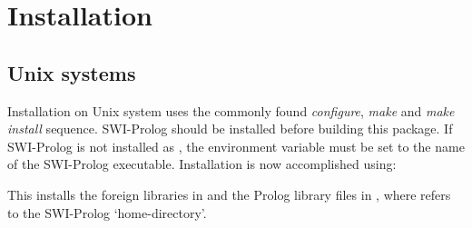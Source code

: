\documentclass[11pt]{article}
\begin{document}
\section{Installation}

\subsection{Unix systems}

Installation on Unix system uses the commonly found {\em configure},
{\em make} and {\em make install} sequence. SWI-Prolog should be
installed before building this package. If SWI-Prolog is not installed
as , the environment variable  must be set to the
name of the SWI-Prolog executable. Installation is now accomplished
using:

\begin{code}
\end{code}

\noindent
This installs the foreign libraries in  and
the Prolog library files in , where
 refers to the SWI-Prolog `home-directory'.
\end{document}
